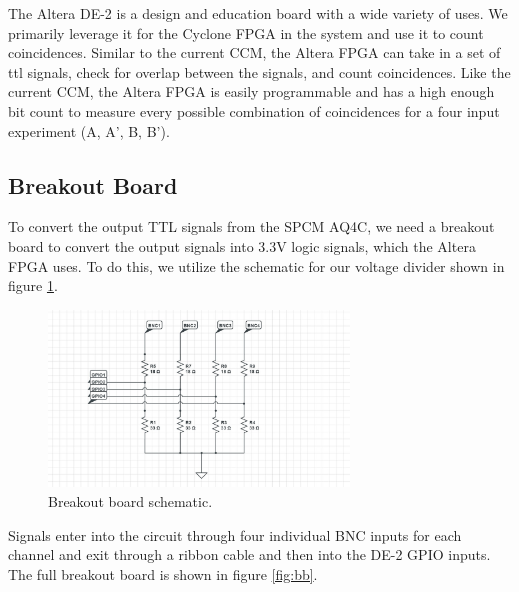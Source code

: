 \documentclass[letterpaper, 11 pt]{article}
\begin{document}
The Altera DE-2 is a design and education board with a wide variety of uses. We primarily leverage it
for the Cyclone FPGA in the system and use it to count coincidences. Similar to the current CCM,
the Altera FPGA can take in a set of ttl signals, check for overlap between the signals, and count coincidences.
Like the current CCM, the Altera FPGA is easily programmable and has a high enough bit count to measure every possible
combination of coincidences for a four input experiment (A, A', B, B').

\subsection{Breakout Board}

To convert the output TTL signals from the SPCM AQ4C, we need a breakout board to convert
the output signals into 3.3V logic signals, which the Altera FPGA uses. To do this, we utilize
the schematic for our voltage divider shown in figure \ref{fig:divide}.
\begin{figure}[H]
    \centering
    \includegraphics[width = 8cm]{BB_schematic.jpg}
    \caption{Breakout board schematic.}
    \label{fig:divide}
\end{figure}
Signals enter into the circuit through four individual BNC inputs for each channel and exit through a ribbon cable and then into the DE-2
GPIO inputs. The full breakout board is shown in figure \ref{fig:bb}.
\end{document}
